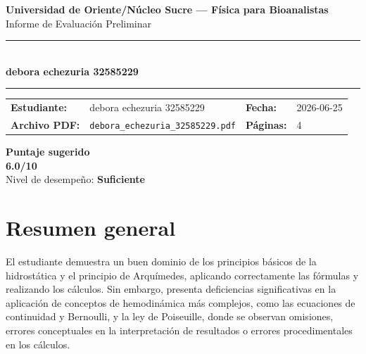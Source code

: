 \documentclass[11pt,a4paper]{article}
\begin{document}
\begin{center}
  {\Large\bfseries\color{azulTitulo} Universidad de Oriente/Núcleo Sucre --- Física para Bioanalistas}\\[4pt]
  {\large Informe de Evaluación Preliminar}\\[12pt]
  \rule{\linewidth}{1.2pt}\\[6pt]
  {\LARGE\bfseries debora echezuria 32585229}\\[4pt]
  \rule{\linewidth}{0.6pt}
\end{center}

\vspace{4pt}
\begin{tcolorbox}[cajaTitulo, title=Datos del informe]
\begin{tabular}{@{}llll@{}}
  \textbf{Estudiante:}  & debora echezuria 32585229  &
  \textbf{Fecha:}       & 2026-06-25 \\[4pt]
  \textbf{Archivo PDF:} & \texttt{debora\_echezuria\_32585229.pdf}  &
  \textbf{Páginas:}     & 4 \\
\end{tabular}
\end{tcolorbox}

\vspace{6pt}
\begin{center}
  \begin{tcolorbox}[
    enhanced,
    colback=white, colframe=desempeno_suficiente,
    width=0.62\linewidth,
    boxrule=2pt,
    halign=center, valign=center,
    top=8pt, bottom=8pt,
  ]
    \centering
    {\large\bfseries Puntaje sugerido}\\[6pt]
    {\Huge\bfseries\color{desempeno_suficiente} 6.0/10}\\[6pt]
    {\large Nivel de desempeño: \textbf{\color{desempeno_suficiente} Suficiente}}
  \end{tcolorbox}
\end{center}

\section*{Resumen general}
El estudiante demuestra un buen dominio de los principios básicos de la hidrostática y el principio de Arquímedes, aplicando correctamente las fórmulas y realizando los cálculos. Sin embargo, presenta deficiencias significativas en la aplicación de conceptos de hemodinámica más complejos, como las ecuaciones de continuidad y Bernoulli, y la ley de Poiseuille, donde se observan omisiones, errores conceptuales en la interpretación de resultados o errores procedimentales en los cálculos.
\end{document}
